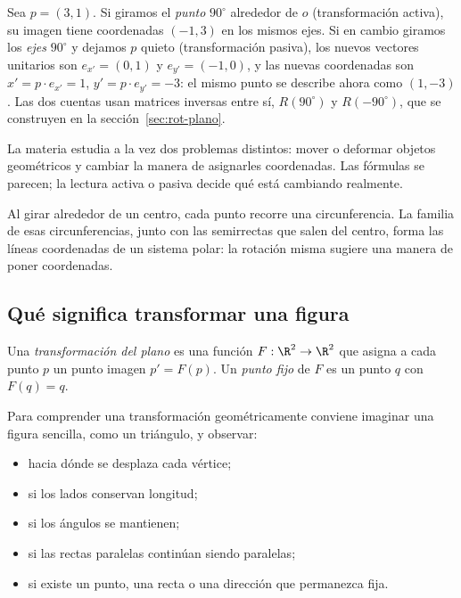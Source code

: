 \begin{ejemplo}
Sea \(p=(3,1)\). Si giramos el \emph{punto} \(90^\circ\) alrededor de \(o\) (transformación
activa), su imagen tiene coordenadas \((-1,3)\) en los mismos ejes. Si en cambio giramos los
\emph{ejes} \(90^\circ\) y dejamos \(p\) quieto (transformación pasiva), los nuevos vectores
unitarios son \(e_{x'}=(0,1)\) y \(e_{y'}=(-1,0)\), y las nuevas coordenadas son
\(x'=p\cdot e_{x'}=1\), \(y'=p\cdot e_{y'}=-3\): el mismo punto se describe ahora como
\((1,-3)\). Las dos cuentas usan matrices inversas entre sí, \(R(90^\circ)\) y \(R(-90^\circ)\),
que se construyen en la sección~\ref{sec:rot-plano}.
\end{ejemplo}

\begin{idea}[Idea]
La materia estudia a la vez dos problemas distintos: mover o deformar objetos geométricos y
cambiar la manera de asignarles coordenadas. Las fórmulas se parecen; la lectura activa o
pasiva decide qué está cambiando realmente.
\end{idea}

\begin{idea}[Idea]
Al girar alrededor de un centro, cada punto recorre una circunferencia. La familia de esas
circunferencias, junto con las semirrectas que salen del centro, forma las líneas coordenadas
de un sistema polar: la rotación misma sugiere una manera de poner coordenadas.
\end{idea}

\subsection{Qué significa transformar una figura}\label{sec:transformar}

\begin{definicion}
Una \emph{transformación del plano} es una función \(F:\R^2\to\R^2\) que asigna a cada punto
\(p\) un punto imagen \(p'=F(p)\). Un \emph{punto fijo} de \(F\) es un punto \(q\) con
\(F(q)=q\).
\end{definicion}

Para comprender una transformación geométricamente conviene imaginar una figura sencilla,
como un triángulo, y observar:
\begin{itemize}
  \item hacia dónde se desplaza cada vértice;
  \item si los lados conservan longitud;
  \item si los ángulos se mantienen;
  \item si las rectas paralelas continúan siendo paralelas;
  \item si existe un punto, una recta o una dirección que permanezca fija.
\end{itemize}

